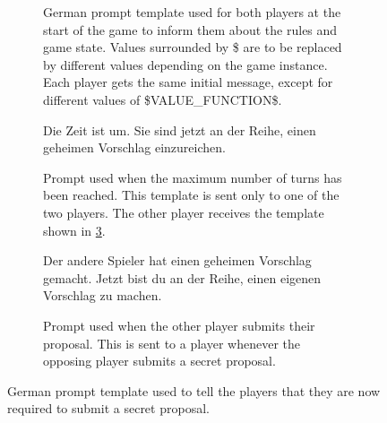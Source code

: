 \documentclass[../main.tex]{subfiles}
\begin{document}
\begin{figure}
\begin{subfigure}[t]{\textwidth}
\begin{prompt}
    \end{prompt}
    \caption{German prompt template used for both players at the start of the game to inform them about the rules and game state. Values surrounded by \$ are to be replaced by different values depending on the game instance. Each player gets the same initial message, except for different values of \$VALUE\_FUNCTION\$.}
    \label{fig:dond_prompt_template_de}
  \end{subfigure}
  \begin{subfigure}[t]{0.48\textwidth}
    \centering
    \begin{prompt}

Die Zeit ist um. Sie sind jetzt an der Reihe, einen geheimen Vorschlag einzureichen.
    \end{prompt}
    \caption{Prompt used when the maximum number of turns has been reached. This template is sent only to one of the two players. The other player receives the template shown in \cref{fig:dond_prompt_template_early_de}.}
    \label{fig:dond_prompt_template_timeout_de}
  \end{subfigure}
  \hfill
  \begin{subfigure}[t]{0.48\textwidth}
    \centering
    \begin{prompt}

Der andere Spieler hat einen geheimen Vorschlag gemacht. Jetzt bist du an der Reihe, einen eigenen Vorschlag zu machen.
    \end{prompt}
    \caption{Prompt used when the other player submits their proposal. This is sent to a player whenever the opposing player submits a secret proposal.}
    \label{fig:dond_prompt_template_early_de}
  \end{subfigure}
  \caption{German prompt template used to tell the players that they are now required to submit a secret proposal.}
  \label{fig:dond_prompt_template_all_de}
\end{figure}
\end{document}
